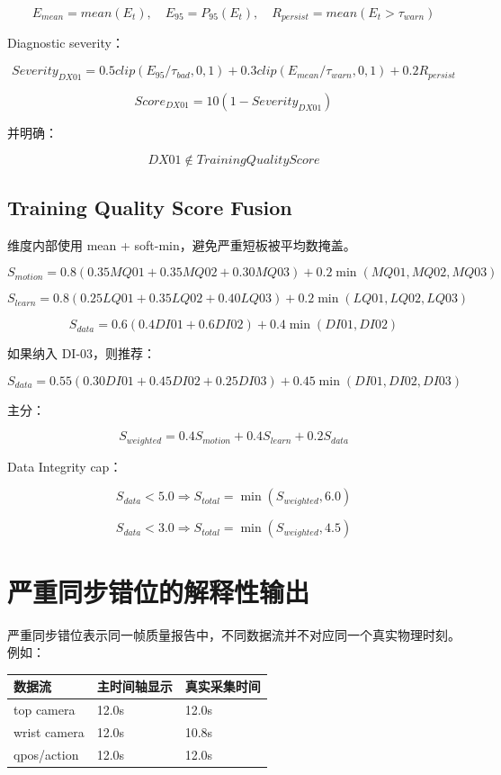 \documentclass[UTF8,zihao=-4]{ctexart}
\begin{document}
\[
E_{mean}=mean(E_t),\quad E_{95}=P_{95}(E_t),\quad R_{persist}=mean(E_t>\tau_{warn})
\]

Diagnostic severity：

\[
Severity_{DX01}=0.5clip(E_{95}/\tau_{bad},0,1)+0.3clip(E_{mean}/\tau_{warn},0,1)+0.2R_{persist}
\]

\[
Score_{DX01}=10(1-Severity_{DX01})
\]

并明确：

\[
DX01\notin TrainingQualityScore
\]

\subsection{Training Quality Score Fusion}

维度内部使用 mean + soft-min，避免严重短板被平均数掩盖。

\[
S_{motion}=0.8(0.35MQ01+0.35MQ02+0.30MQ03)+0.2\min(MQ01,MQ02,MQ03)
\]

\[
S_{learn}=0.8(0.25LQ01+0.35LQ02+0.40LQ03)+0.2\min(LQ01,LQ02,LQ03)
\]

\[
S_{data}=0.6(0.4DI01+0.6DI02)+0.4\min(DI01,DI02)
\]

如果纳入 DI-03，则推荐：

\[
S_{data}=0.55(0.30DI01+0.45DI02+0.25DI03)+0.45\min(DI01,DI02,DI03)
\]

主分：

\[
S_{weighted}=0.4S_{motion}+0.4S_{learn}+0.2S_{data}
\]

Data Integrity cap：

\[
S_{data}<5.0\Rightarrow S_{total}=\min(S_{weighted},6.0)
\]

\[
S_{data}<3.0\Rightarrow S_{total}=\min(S_{weighted},4.5)
\]

\section{严重同步错位的解释性输出}

严重同步错位表示同一帧质量报告中，不同数据流并不对应同一个真实物理时刻。例如：

\begin{center}
\begin{tabular}{lll}
\toprule
数据流 & 主时间轴显示 & 真实采集时间 \\
\midrule
top camera & 12.0s & 12.0s \\
wrist camera & 12.0s & 10.8s \\
qpos/action & 12.0s & 12.0s \\
\bottomrule
\end{tabular}
\end{center}
\end{document}
